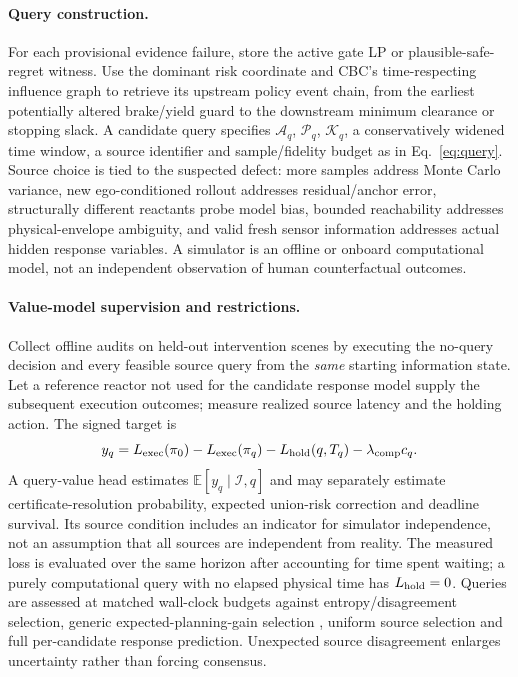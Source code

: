 \documentclass[10pt]{article}
\begin{document}
\paragraph{Query construction.}
For each provisional evidence failure, store the active gate LP or plausible-safe-regret witness. Use the dominant risk coordinate and CBC's time-respecting influence graph to retrieve its upstream policy event chain, from the earliest potentially altered brake/yield guard to the downstream minimum clearance or stopping slack. A candidate query specifies $\mathcal A_q$, $\mathcal P_q$, $\mathcal K_q$, a conservatively widened time window, a source identifier and sample/fidelity budget as in Eq.~\eqref{eq:query}. Source choice is tied to the suspected defect: more samples address Monte Carlo variance, new ego-conditioned rollout addresses residual/anchor error, structurally different reactants probe model bias, bounded reachability addresses physical-envelope ambiguity, and valid fresh sensor information addresses actual hidden response variables. A simulator is an offline or onboard computational model, not an independent observation of human counterfactual outcomes.

\paragraph{Value-model supervision and restrictions.}
Collect offline audits on held-out intervention scenes by executing the no-query decision and every feasible source query from the \emph{same} starting information state. Let a reference reactor not used for the candidate response model supply the subsequent execution outcomes; measure realized source latency and the holding action. The signed target is
\begin{equation}
 y_q=L_{\rm exec}(\pi_0)-L_{\rm exec}(\pi_q)
 -L_{\rm hold}(q,T_q)-\lambda_{\rm comp}c_q.
 \label{eq:querytarget}
\end{equation}
A query-value head estimates $\mathbb E[y_q\mid\mathscr I,q]$ and may separately estimate certificate-resolution probability, expected union-risk correction and deadline survival. Its source condition includes an indicator for simulator independence, not an assumption that all sources are independent from reality. The measured loss is evaluated over the same horizon after accounting for time spent waiting; a purely computational query with no elapsed physical time has $L_{\rm hold}=0$. Queries are assessed at matched wall-clock budgets against entropy/disagreement selection, generic expected-planning-gain selection \parencite{chen2026not}, uniform source selection and full per-candidate response prediction. Unexpected source disagreement enlarges uncertainty rather than forcing consensus.
\end{document}
